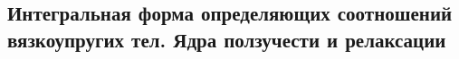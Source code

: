 

\subsection{Интегральная форма определяющих соотношений вязкоупругих тел. Ядра ползучести и релаксации}



